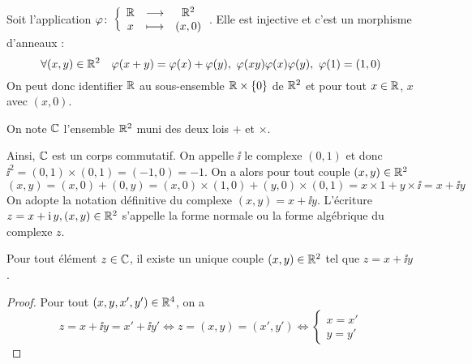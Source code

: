Soit l'application \(\varphi\colon \left\{\begin{array}{ccc} \mathbb{R} & \longrightarrow &\mathbb{R}^2\\ x & \longmapsto & (x,0) \end{array} \right.\). Elle est injective et c'est un morphisme d'anneaux :
\begin{equation}
  \forall (x,y) \in \R^2 \quad \varphi(x+y)=\varphi(x)+\varphi(y), \ \varphi(xy)\varphi(x)\varphi(y), \ \varphi(1)=(1,0)
\end{equation}
On peut donc identifier \(\mathbb{R}\) au sous-ensemble \(\mathbb{R} \times \{0\}\) de \(\mathbb{R}^2\) et pour tout \(x \in \mathbb{R}\), \(x\) avec \((x,0)\).
\begin{defdef}
  On note \(\mathbb{C}\) l'ensemble \(\mathbb{R}^2\) muni des deux lois \(+\) et \(\times\).
\end{defdef}
Ainsi, \(\mathbb{C}\) est un corps commutatif. On appelle \(\ii\) le complexe \((0,1)\) et donc \(\ii^2 = (0,1) \times (0,1)=(-1,0)=-1\). On a alors pour tout couple \((x,y) \in \mathbb{R}^2\)
\begin{equation}
  (x,y)=(x,0) + (0,y) = (x,0) \times (1,0) + (y,0) \times (0,1) = x \times 1 + y \times \ii = x+ \ii y
\end{equation}
On adopte la notation définitive du complexe \((x,y)=x+\ii y\). L'écriture \(z=x+\operatorname{i} y, (x,y) \in \mathbb{R}^2\) s'appelle la forme normale ou la forme algébrique du complexe \(z\).
\begin{prop}
  Pour tout élément \(z \in \mathbb{C}\), il existe un unique couple \((x,y) \in \mathbb{R}^2\) tel que \(z=x+\ii y\).
\end{prop}
\begin{proof}
  Pour tout \((x,y,x',y') \in \mathbb{R}^4\), on a
  \begin{equation}
    z=x+\ii y =x'+\ii y' \Longleftrightarrow z=(x,y)=(x',y') \Longleftrightarrow \begin{cases} x=x' \\ y=y'\end{cases}
  \end{equation}
\end{proof}

